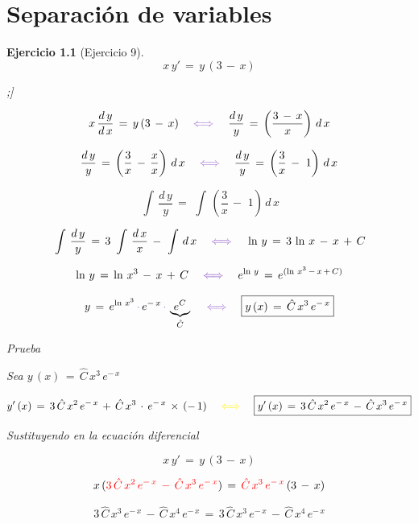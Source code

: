 \documentclass[a4paper,11pt]{book}
\newtheorem{ejer}{Ejercicio}[section]
\newcommand*{\itembolasazules}[1]{%

\footnotesize\protect\tikz[baseline=-3pt]%

\protect\node[scale=.7, circle, shade, ball 

color=green]{\color{white}\Large\bf#1};}
\begin{document}
\chapter{Separación de variables} 

\begin{ejer}[Ejercicio 9] 

  $$x\,y'\,=\,y\,(3\,-\,x)$$ 
  
\begin{enumerate}[label=\itembolasazules{\arabic*}] 

 $$x\,\dfrac{d\,y}{d\,x}\,=\,y\,(3\,-\,x) \quad \textcolor{amethyst}{\iff} \quad \dfrac{d\,y}{y}\,=\,\left(\dfrac{3\,-\,x}{x} \right)\,d\,x$$ 

 $$\dfrac{d\,y}{y}\,=\,\left(\dfrac{3}{x}\,-\,\dfrac{x}{x} \right)\,d\,x \quad \textcolor{amethyst}{\iff} \quad \dfrac{d\,y}{y}\,=\,\left(\dfrac{3}{x}\,-\,\,1 \right)\,d\,x$$ 

 $$\displaystyle\,\int\,\dfrac{d\,y}{y}\,=\,\displaystyle\,\int\,\left(\dfrac{3}{x}\,-\,\,1 \right)\,d\,x$$ 

 $$\displaystyle\,\int\,\dfrac{d\,y}{y}\,=\,3\,\displaystyle\,\int\,\dfrac{d\,x}{x}\,-\,\displaystyle\,\int\,d\,x \quad \textcolor{amethyst}{\iff} \quad \ln\,y\,=\,3\,\ln\,x\,-\,x\,+\,C$$ 

 $$\ln\,y\,=\,\ln\,x^{3}\,-\,x\,+\,C \quad \textcolor{amethyst}{\iff} \quad e^{\ln\,y}\,=\,e^{(\ln\,x^{3}\,-\,x\,+\,C)}$$ 

 $$y\,=\,e^{\ln\,x^{3}}\,\textcolor{amethyst}{\cdot}\,e^{-\,x}\,\textcolor{amethyst}{\cdot}\,\underbrace{e^{C}}_{\hat{C}} \quad \textcolor{amethyst}{\iff} \quad \boxed{y\,(x)\,=\,\hat{C}\,x^{3}\,e^{-\,x}}$$ 

Prueba  

Sea $\boxed{y\,(x)\,=\,\hat{C}\,x^{3}\,e^{-\,x}}$ 

$$y'\,(x)\,=\,3\,\hat{C}\,x^{2}\,e^{-\,x}\,+\,\hat{C}\,x^{3}\,\cdot\,e^{-\,x}\,\times\,(-\,1) \quad \textcolor{yellow}{\iff} \quad \boxed{y'\,(x)\,=\,3\,\hat{C}\,x^{2}\,e^{-\,x}\,-\,\hat{C}\,x^{3}\,e^{-\,x}}$$ 

Sustituyendo en la ecuación diferencial 

$$x\,y'\,=\,y\,(3\,-\,x)$$  

$$x\,(\textcolor{red}{3\,\hat{C}\,x^{2}\,e^{-\,x}\,-\,\hat{C}\,x^{3}\,e^{-\,x}})\,=\,\textcolor{red}{\hat{C}\,x^{3}\,e^{-\,x}}\,(3\,-\,x)$$ 

$$\boxed{3\,\hat{C}\,x^{3}\,e^{-\,x}\,-\,\hat{C}\,x^{4}\,e^{-\,x}\,=\,3\,\hat{C}\,x^{3}\,e^{-\,x}\,-\,\hat{C}\,x^{4}\,e^{-\,x}}$$ 

\end{enumerate} 

\end{ejer} 
\end{document}
